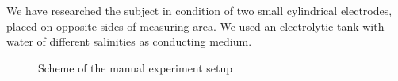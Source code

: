 \documentclass{article}
\begin{document}
We have researched the subject in condition of two small cylindrical electrodes, placed on opposite sides of measuring area. We used an electrolytic tank with water of different salinities as conducting medium.



\begin{figure}[h]
\begin{center}
\begin{minipage}[h]{0.47\linewidth}
\caption{Scheme of the manual experiment setup}
\label{fig:mesh1}
\end{minipage}
\hfill
\begin{minipage}[h]{0.47\linewidth}

\end{minipage}
\end{center}
\end{figure}
\end{document}

